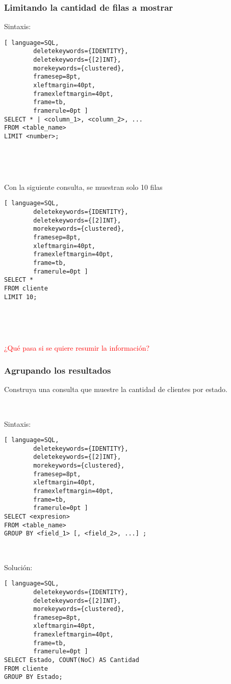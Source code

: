 \begin{frame}[fragile]
	
	\frametitle{Limitando la cantidad de filas a mostrar}
	
	Sintaxis:
	\begin{lstlisting}[ language=SQL,
		deletekeywords={IDENTITY},
		deletekeywords={[2]INT},
		morekeywords={clustered},
		framesep=8pt,
		xleftmargin=40pt,
		framexleftmargin=40pt,
		frame=tb,
		framerule=0pt ]
SELECT * | <column_1>, <column_2>, ...
FROM <table_name>
LIMIT <number>;
\end{lstlisting}
	
	\pause 
	
	\ 
	
	\ 
	
	Con la siguiente consulta, se muestran solo 10 filas 
	
	\begin{lstlisting}[ language=SQL,
		deletekeywords={IDENTITY},
		deletekeywords={[2]INT},
		morekeywords={clustered},
		framesep=8pt,
		xleftmargin=40pt,
		framexleftmargin=40pt,
		frame=tb,
		framerule=0pt ]
SELECT *
FROM cliente
LIMIT 10;
\end{lstlisting}
	
	\pause
	
	\ 
	
	\ 
	
	
	\textcolor{red}{¿Qué pasa si se quiere resumir la información?}
	

\end{frame}


\begin{frame}[fragile]

	\frametitle{Agrupando los resultados}
	
	Construya una consulta que muestre la cantidad de clientes por estado.
	
		\pause
	
	\ 
	
	Sintaxis:
	\begin{lstlisting}[ language=SQL,
		deletekeywords={IDENTITY},
		deletekeywords={[2]INT},
		morekeywords={clustered},
		framesep=8pt,
		xleftmargin=40pt,
		framexleftmargin=40pt,
		frame=tb,
		framerule=0pt ]
SELECT <expresion>
FROM <table_name>
GROUP BY <field_1> [, <field_2>, ...] ;
\end{lstlisting} 
	
	\pause
	
	\ 
	
	Solución:
		\begin{lstlisting}[ language=SQL,
		deletekeywords={IDENTITY},
		deletekeywords={[2]INT},
		morekeywords={clustered},
		framesep=8pt,
		xleftmargin=40pt,
		framexleftmargin=40pt,
		frame=tb,
		framerule=0pt ]
SELECT Estado, COUNT(NoC) AS Cantidad
FROM cliente 
GROUP BY Estado;
\end{lstlisting} 
	
\end{frame}

